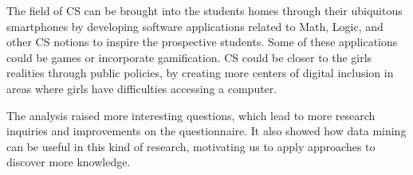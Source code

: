 The field of CS can be brought into the students homes through their ubiquitous smartphones by developing software applications related to Math, Logic, and other CS notions to inspire the prospective students. Some of these  applications could be games or incorporate gamification. CS could be closer to the girls realities through public policies, by creating more centers of digital inclusion in areas where girls have difficulties accessing a computer.

The analysis raised more interesting questions, which lead to more research inquiries and improvements on the questionnaire. It also showed how data mining can be useful in this kind of research, motivating us to apply approaches to discover more knowledge.